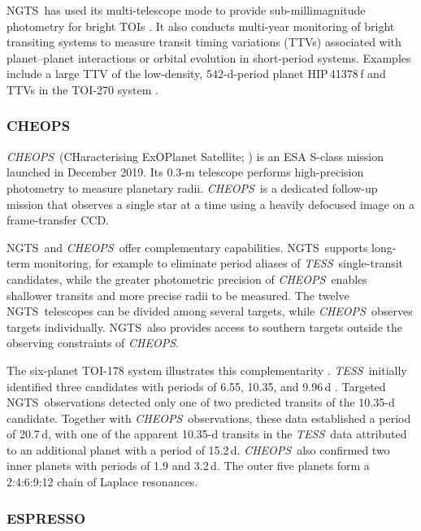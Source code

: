 \documentclass[fleqn,usenatbib]{mnras}
\newcommand{\ngts}{{NGTS}}
\newcommand{\tess}{{\it TESS}}
\newcommand{\cheops}{{\it CHEOPS}}
\begin{document}
\ngts\ has used its multi-telescope mode to provide sub-millimagnitude photometry for bright TOIs \citep{2020Natur.583...39A,2019ESS.....410307J,2020A&A...639A..76N,2021MNRAS.507.2782O,2022MNRAS.510.5464K,2023MNRAS.520.3649H}. It also conducts multi-year monitoring of bright transiting systems to measure transit timing variations (TTVs) associated with planet--planet interactions or orbital evolution in short-period systems. Examples include a large TTV of the low-density, 542-d-period planet HIP\,41378\,f \citep{2021MNRAS.504L..45B} and TTVs in the TOI-270 system \citep{2022MNRAS.510.5464K}.

\subsubsection{CHEOPS}
\label{sec:cheops}

\cheops\ (CHaracterising ExOPlanet Satellite; \citealt{2021ExA....51..109B}) is an ESA S-class mission launched in December 2019. Its 0.3-m telescope performs high-precision photometry to measure planetary radii. \cheops\ is a dedicated follow-up mission that observes a single star at a time using a heavily defocused image on a frame-transfer CCD.

\ngts\ and \cheops\ offer complementary capabilities. \ngts\ supports long-term monitoring, for example to eliminate period aliases of \tess\ single-transit candidates, while the greater photometric precision of \cheops\ enables shallower transits and more precise radii to be measured. The twelve \ngts\ telescopes can be divided among several targets, while \cheops\ observes targets individually. \ngts\ also provides access to southern targets outside the observing constraints of \cheops.

The six-planet TOI-178 system illustrates this complementarity \citep{2021A&A...649A..26L}. \tess\ initially identified three candidates with periods of 6.55, 10.35, and 9.96\,d \citep{2019A&A...624A..46L}. Targeted \ngts\ observations detected only one of two predicted transits of the 10.35-d candidate. Together with \cheops\ observations, these data established a period of 20.7\,d, with one of the apparent 10.35-d transits in the \tess\ data attributed to an additional planet with a period of 15.2\,d. \cheops\ also confirmed two inner planets with periods of 1.9 and 3.2\,d. The outer five planets form a 2:4:6:9:12 chain of Laplace resonances.

\subsubsection{ESPRESSO}
\end{document}
